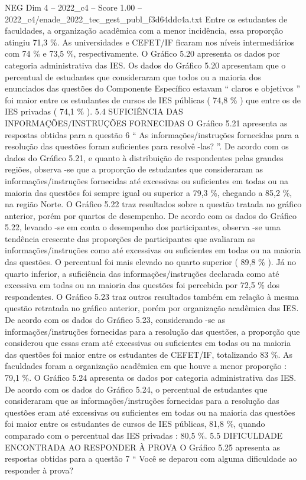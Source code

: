 \begin{textsample}{NEG Dim 4 – 2022\_c4 – Score 1.00 – 2022\_c4/enade\_2022\_tec\_gest\_publ\_f3d64ddc4a.txt}
Entre os estudantes de faculdades, a organização acadêmica com a menor incidência, essa proporção atingiu 71,3 \%.
As universidades e CEFET/IF ficaram nos níveis intermediários com 74 \% e 73,5 \%, respectivamente.
O Gráfico 5.20 apresenta os dados por categoria administrativa das IES.
Os dados do Gráfico 5.20 apresentam que o percentual de estudantes que consideraram que todos ou a maioria dos enunciados das questões do Componente Específico estavam “ claros e objetivos ” foi maior entre os estudantes de cursos de IES públicas ( 74,8 \% ) que entre os de IES privadas ( 74,1 \% ). 5.4 SUFICIÊNCIA DAS INFORMAÇÕES/INSTRUÇÕES FORNECIDAS O Gráfico 5.21 apresenta as respostas obtidas para a questão 6 “ As informações/instruções fornecidas para a resolução das questões foram suficientes para resolvê -las? ”.
De acordo com os dados do Gráfico 5.21, e quanto à distribuição de respondentes pelas grandes regiões, observa -se que a proporção de estudantes que consideraram as informações/instruções fornecidas até excessivas ou suficientes em todas ou na maioria das questões foi sempre igual ou superior a 79,3 \%, chegando a 85,2 \%, na região Norte.
O Gráfico 5.22 traz resultados sobre a questão tratada no gráfico anterior, porém por quartos de desempenho.
De acordo com os dados do Gráfico 5.22, levando -se em conta o desempenho dos participantes, observa -se uma tendência crescente das proporções de participantes que avaliaram as informações/instruções como até excessivas ou suficientes em todas ou na maioria das questões.
O percentual foi mais elevado no quarto superior ( 89,8 \% ).
Já no quarto inferior, a suficiência das informações/instruções declarada como até excessiva em todas ou na maioria das questões foi percebida por 72,5 \% dos respondentes.
O Gráfico 5.23 traz outros resultados também em relação à mesma questão retratada no gráfico anterior, porém por organização acadêmica das IES.
De acordo com os dados do Gráfico 5.23, considerando -se as informações/instruções fornecidas para a resolução das questões, a proporção que considerou que essas eram até excessivas ou suficientes em todas ou na maioria das questões foi maior entre os estudantes de CEFET/IF, totalizando 83 \%.
As faculdades foram a organização acadêmica em que houve a menor proporção : 79,1 \%.
O Gráfico 5.24 apresenta os dados por categoria administrativa das IES.
De acordo com os dados do Gráfico 5.24, o percentual de estudantes que consideraram que as informações/instruções fornecidas para a resolução das questões eram até excessivas ou suficientes em todas ou na maioria das questões foi maior entre os estudantes de cursos de IES públicas, 81,8 \%, quando comparado com o percentual das IES privadas : 80,5 \%. 5.5 DIFICULDADE ENCONTRADA AO RESPONDER À PROVA O Gráfico 5.25 apresenta as respostas obtidas para a questão 7 “ Você se deparou com alguma dificuldade ao responder à prova?

\end{textsample}

